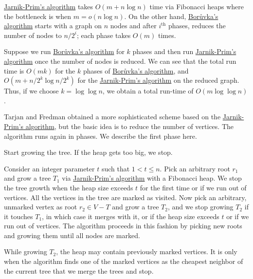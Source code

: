 \begin{prev}
	\hyperref[algo:Jarnik-Prim]{Jarnik-Prim's algorithm} takes \(O(m + n \log n)\) time via Fibonacci heaps where the bottleneck is when \(m = o(n \log n)\). On the other hand, \hyperref[algo:Boruvka]{Borůvka's algorithm} starts with a graph on \(n\) nodes and after \(i^{\text{th} }\) phases, reduces the number of nodes to \(n / 2^i\); each phase takes \(O(m)\) times.
\end{prev}

\begin{intuition}
	Suppose we run \hyperref[algo:Boruvka]{Borůvka's algorithm} for \(k\) phases and then run \hyperref[algo:Jarnik-Prim]{Jarnik-Prim's algorithm} once the number of nodes is reduced. We can see that the total run time is \(O(m k)\) for the \(k\) phases of \hyperref[algo:Boruvka]{Borůvka's algorithm}, and \(O(m + n / 2^k \log n / 2^k)\) for the \hyperref[algo:Jarnik-Prim]{Jarnik-Prim's algorithm} on the reduced graph. Thus, if we choose \(k = \log \log n\), we obtain a total run-time of \(O(m \log \log n)\).
\end{intuition}

Tarjan and Fredman obtained a more sophisticated scheme based on the \hyperref[algo:Jarnik-Prim]{Jarnik-Prim's algorithm}, but the basic idea is to reduce the number of vertices. The algorithm runs again in phases. We describe the first phase here.

\begin{intuition}
	Start growing the tree. If the heap gets too big, we stop.
\end{intuition}

Consider an integer  parameter \(t\) such that \(1 < t \leq n\). Pick an arbitrary root \(r_1\) and grow a tree \(T_1\) via \hyperref[algo:Jarnik-Prim]{Jarnik-Prim's algorithm} with a Fibonacci heap. We stop the tree growth when the heap size exceeds \(t\) for the first time or if we run out of vertices. All the vertices in the tree are marked as visited. Now pick an arbitrary, unmarked vertex as root \(r_2 \in V - T\) and grow a tree \(T_2\), and we stop growing \(T_2\) if it touches \(T_1\), in which case it merges with it, or if the heap size exceeds \(t\) or if we run out of vertices. The algorithm proceeds in this fashion by picking new roots and growing them until all nodes are marked.

\begin{note}
	While growing \(T_2\), the heap may contain previously marked vertices. It is only when the algorithm finds one of the marked vertices as the cheapest neighbor of the current tree that we merge the trees and stop.
\end{note}

